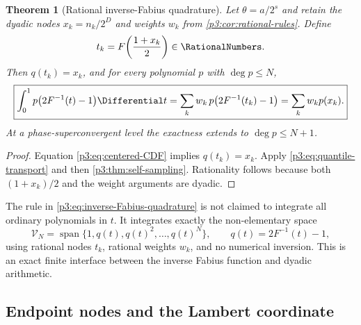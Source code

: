 \documentclass[11pt,oneside]{article}
\numberwithin{equation}{section}
\newtheorem{theorem}{Theorem}[section]
\theoremstyle{definition}
\theoremstyle{remark}
\begin{document}
\begin{theorem}[Rational inverse-Fabius quadrature]
\label{p3:thm:inverse-Fabius-quadrature}
Let $\theta=a/2^s$ and retain the dyadic nodes $x_k=n_k/2^D$ and weights $w_k$ from \cref{p3:cor:rational-rules}.  Define
\begin{equation}
 t_k=F\!\left(\frac{1+x_k}{2}\right)\in\RationalNumbers.
 \label{p3:eq:inverse-Fabius-nodes}
\end{equation}
Then $q(t_k)=x_k$, and for every polynomial $p$ with $\deg p\le N$,
\begin{equation}
 \boxed{\displaystyle
 \int_0^1p\bigl(2F^{-1}(t)-1\bigr)\Differential t
 =\sum_k w_k\,p\bigl(2F^{-1}(t_k)-1\bigr)
 =\sum_k w_kp(x_k).}
 \label{p3:eq:inverse-Fabius-quadrature}
\end{equation}
At a phase-superconvergent level the exactness extends to $\deg p\le N+1$.
\end{theorem}

\begin{proof}
Equation \eqref{p3:eq:centered-CDF} implies $q(t_k)=x_k$.  Apply \eqref{p3:eq:quantile-transport} and then \cref{p3:thm:self-sampling}.  Rationality follows because both $(1+x_k)/2$ and the weight arguments are dyadic.
\end{proof}

\begin{remark}
The rule in \eqref{p3:eq:inverse-Fabius-quadrature} is not claimed to integrate all ordinary polynomials in $t$.  It integrates exactly the non-elementary space
\begin{equation}
 \mathcal V_N
 =\operatorname{span}\{1,q(t),q(t)^2,\ldots,q(t)^N\},
 \qquad q(t)=2F^{-1}(t)-1,
 \label{p3:eq:inverse-exactness-space}
\end{equation}
using rational nodes $t_k$, rational weights $w_k$, and no numerical inversion.  This is an exact finite interface between the inverse Fabius function and dyadic arithmetic.
\end{remark}

\subsection{Endpoint nodes and the Lambert coordinate}
\end{document}
